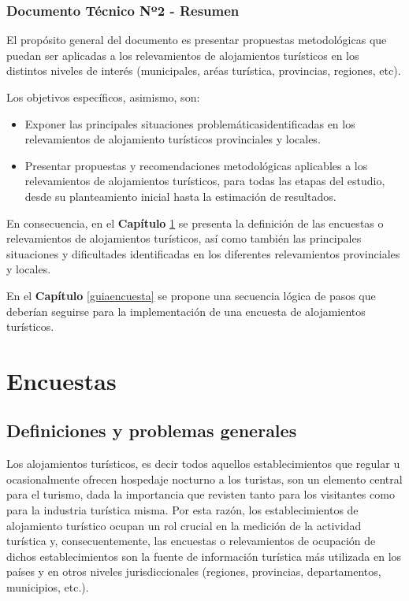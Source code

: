 \documentclass[
]{book}
\begin{document}
\hypertarget{documento-tuxe9cnico-nuxba2---resumen}{%
\subsection*{Documento Técnico Nº2 - Resumen}\label{documento-tuxe9cnico-nuxba2---resumen}}

El propósito general del documento es presentar propuestas metodológicas que puedan ser aplicadas a los relevamientos de alojamientos turísticos en los distintos niveles de interés (municipales, aréas turística, provincias, regiones, etc).

Los objetivos específicos, asimismo, son:

\begin{itemize}
\item
  Exponer las principales situaciones problemáticasidentificadas en los relevamientos de alojamiento turísticos provinciales y locales.
\item
  Presentar propuestas y recomendaciones metodológicas aplicables a los relevamientos de alojamientos turísticos, para todas las etapas del estudio, desde su planteamiento inicial hasta la estimación de resultados.
\end{itemize}

En consecuencia, en el \textbf{Capítulo} \ref{encuesta} se presenta la definición de las encuestas o relevamientos de alojamientos turísticos, así como también las principales situaciones y dificultades identificadas en los diferentes relevamientos provinciales y locales.

En el \textbf{Capítulo} \ref{guiaencuesta} se propone una secuencia lógica de pasos que deberían seguirse para la implementación de una encuesta de alojamientos turísticos.

\hypertarget{encuesta}{%
\chapter{\texorpdfstring{\textbf{Encuestas}}{Encuestas}}\label{encuesta}}

\hypertarget{definiciones-y-problemas-generales}{%
\section{Definiciones y problemas generales}\label{definiciones-y-problemas-generales}}

Los alojamientos turísticos, es decir todos aquellos establecimientos que regular u ocasionalmente ofrecen hospedaje nocturno a los turistas, son un elemento central para el turismo, dada la importancia que revisten tanto para los visitantes como para la industria turística misma. Por esta razón, los establecimientos de alojamiento turístico ocupan un rol crucial en la medición de la actividad turística y, consecuentemente, las encuestas o relevamientos de ocupación de dichos establecimientos son la fuente de información turística más utilizada en los países y en otros niveles jurisdiccionales (regiones, provincias, departamentos, municipios, etc.).
\end{document}
